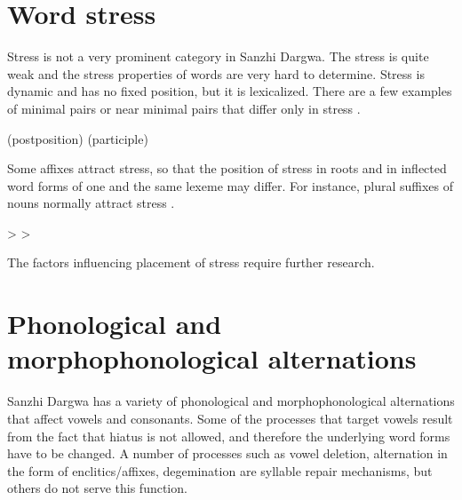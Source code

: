
\section{Word stress}
\label{sec:Word stress}

Stress is not a very prominent category in Sanzhi Dargwa. The stress is quite weak and the stress properties of words are very hard to determine. Stress is dynamic and has no fixed position, but it is lexicalized. There are a few examples of minimal pairs or near minimal pairs that differ only in stress .
%
\begin{exe}
	\ex	\label{ex:stress minimal pairs phon}
	\begin{xlist}
\TabPositions{14em}
		\ex	{} 		\tab {} 
		\ex	{} 		\tab {} 		
		\ex	{}  (postposition) \tab {}  (participle)
		\ex	{}  \tab {} 
	\end{xlist}
\end{exe}

Some affixes attract stress, so that the position of stress in roots and in inflected word forms of one and the same lexeme may differ. For instance, plural suffixes of nouns normally attract stress .
%
\begin{exe}
	\ex	\label{ex:plural attract stress phon}
	\begin{xlist}
		\ex	{}  >  \sqt{sack\tsc{-pl}}
		\ex	{}  >  \sqt{pit\tsc{-pl}}
	\end{xlist}
\end{exe}

The factors influencing placement of stress require further research.



\section{Phonological and morphophonological alternations}
\label{sec:Phonological and morphophonological alternations}

Sanzhi Dargwa has a variety of phonological and morphophonological alternations that affect vowels and consonants. Some of the processes that target vowels result from the fact that hiatus is not allowed, and therefore the underlying word forms have to be changed. A number of processes such as vowel deletion, alternation in the form of enclitics\slash affixes, degemination are syllable repair mechanisms, but others do not serve this function.

